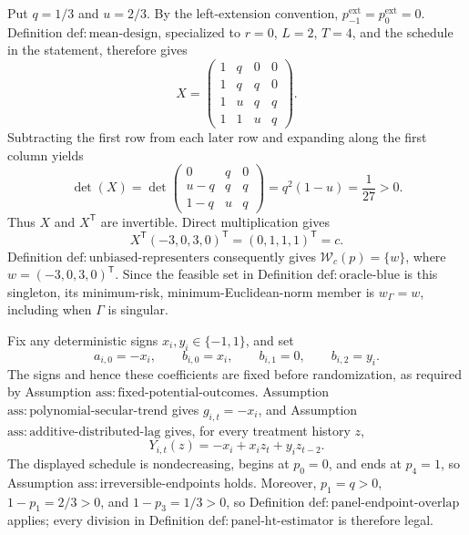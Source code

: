 Put \(q=1/3\) and \(u=2/3\).  By the left-extension convention, \(p^{\mathrm{ext}}_{-1}=p^{\mathrm{ext}}_0=0\).  Definition \(\mathrm{def:mean\text{-}design}\), specialized to \(r=0\), \(L=2\), \(T=4\), and the schedule in the statement, therefore gives
\[
X=
\begin{pmatrix}
1&q&0&0\\
1&q&q&0\\
1&u&q&q\\
1&1&u&q
\end{pmatrix}.
\]
Subtracting the first row from each later row and expanding along the first column yields
\[
\det(X)
=\det\!\begin{pmatrix}
0&q&0\\
u-q&q&q\\
1-q&u&q
\end{pmatrix}
=q^2(1-u)=\frac1{27}>0.
\]
Thus \(X\) and \(X^{\mathsf T}\) are invertible.  Direct multiplication gives
\[
X^{\mathsf T}(-3,0,3,0)^{\mathsf T}
=(0,1,1,1)^{\mathsf T}=c.
\]
Definition \(\mathrm{def:unbiased\text{-}representers}\) consequently gives \(\mathcal W_c(p)=\{w\}\), where \(w=(-3,0,3,0)^{\mathsf T}\).  Since the feasible set in Definition \(\mathrm{def:oracle\text{-}blue}\) is this singleton, its minimum-risk, minimum-Euclidean-norm member is \(w_\Gamma=w\), including when \(\Gamma\) is singular.

Fix any deterministic signs \(x_i,y_i\in\{-1,1\}\), and set
\[
a_{i,0}=-x_i,\qquad b_{i,0}=x_i,\qquad b_{i,1}=0,
\qquad b_{i,2}=y_i.
\tag{1}
\]
The signs and hence these coefficients are fixed before randomization, as required by Assumption \(\mathrm{ass:fixed\text{-}potential\text{-}outcomes}\).  Assumption \(\mathrm{ass:polynomial\text{-}secular\text{-}trend}\) gives \(g_{i,t}=-x_i\), and Assumption \(\mathrm{ass:additive\text{-}distributed\text{-}lag}\) gives, for every treatment history \(z\),
\[
Y_{i,t}(z)=-x_i+x_i z_t+y_i z_{t-2}.
\tag{2}
\]
The displayed schedule is nondecreasing, begins at \(p_0=0\), and ends at \(p_4=1\), so Assumption \(\mathrm{ass:irreversible\text{-}endpoints}\) holds.  Moreover, \(p_1=q>0\), \(1-p_1=2/3>0\), and \(1-p_3=1/3>0\), so Definition \(\mathrm{def:panel\text{-}endpoint\text{-}overlap}\) applies; every division in Definition \(\mathrm{def:panel\text{-}ht\text{-}estimator}\) is therefore legal.

